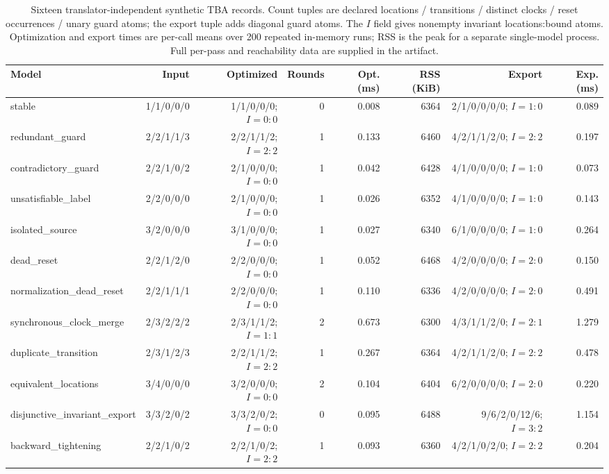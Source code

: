 \begin{table}[t]
\centering
\caption{Sixteen translator-independent synthetic TBA records. Count tuples are declared locations / transitions / distinct clocks / reset occurrences / unary guard atoms; the export tuple adds diagonal guard atoms. The $I$ field gives nonempty invariant locations:bound atoms. Optimization and export times are per-call means over 200 repeated in-memory runs; RSS is the peak for a separate single-model process. Full per-pass and reachability data are supplied in the artifact.}
\label{tab:synthetic-tba}
\scriptsize
\begin{adjustbox}{max width=\textwidth}\begin{tabular}{@{}lrrrrrrr@{}}
\toprule
Model & Input & Optimized & Rounds & Opt. (ms) & RSS (KiB) & Export & Exp. (ms)\\
\midrule
stable & 1/1/0/0/0 & 1/1/0/0/0; $I=0:0$ & 0 & 0.008 & 6364 & 2/1/0/0/0/0; $I=1:0$ & 0.089\\
redundant\_guard & 2/2/1/1/3 & 2/2/1/1/2; $I=2:2$ & 1 & 0.133 & 6460 & 4/2/1/1/2/0; $I=2:2$ & 0.197\\
contradictory\_guard & 2/2/1/0/2 & 2/1/0/0/0; $I=0:0$ & 1 & 0.042 & 6428 & 4/1/0/0/0/0; $I=1:0$ & 0.073\\
unsatisfiable\_label & 2/2/0/0/0 & 2/1/0/0/0; $I=0:0$ & 1 & 0.026 & 6352 & 4/1/0/0/0/0; $I=1:0$ & 0.143\\
isolated\_source & 3/2/0/0/0 & 3/1/0/0/0; $I=0:0$ & 1 & 0.027 & 6340 & 6/1/0/0/0/0; $I=1:0$ & 0.264\\
dead\_reset & 2/2/1/2/0 & 2/2/0/0/0; $I=0:0$ & 1 & 0.052 & 6468 & 4/2/0/0/0/0; $I=2:0$ & 0.150\\
normalization\_dead\_reset & 2/2/1/1/1 & 2/2/0/0/0; $I=0:0$ & 1 & 0.110 & 6336 & 4/2/0/0/0/0; $I=2:0$ & 0.491\\
synchronous\_clock\_merge & 2/3/2/2/2 & 2/3/1/1/2; $I=1:1$ & 2 & 0.673 & 6300 & 4/3/1/1/2/0; $I=2:1$ & 1.279\\
duplicate\_transition & 2/3/1/2/3 & 2/2/1/1/2; $I=2:2$ & 1 & 0.267 & 6364 & 4/2/1/1/2/0; $I=2:2$ & 0.478\\
equivalent\_locations & 3/4/0/0/0 & 3/2/0/0/0; $I=0:0$ & 2 & 0.104 & 6404 & 6/2/0/0/0/0; $I=2:0$ & 0.220\\
disjunctive\_invariant\_export & 3/3/2/0/2 & 3/3/2/0/2; $I=0:0$ & 0 & 0.095 & 6488 & 9/6/2/0/12/6; $I=3:2$ & 1.154\\
backward\_tightening & 2/2/1/0/2 & 2/2/1/0/2; $I=2:2$ & 1 & 0.093 & 6360 & 4/2/1/0/2/0; $I=2:2$ & 0.204\\

\end{tabular}
\end{adjustbox}
\end{table}
